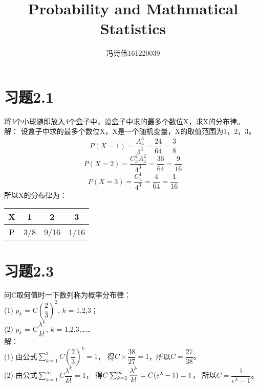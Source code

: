 \documentclass[a4papers]{ctexart}
\title{Probability and Mathmatical Statistics}
\author{冯诗伟161220039}
\date{}
\begin{document}
\maketitle
\section{习题2.1}
将3个小球随即放入4个盒子中，设盒子中求的最多个数位X，求X的分布律。\\
\noindent 解：
\indent 设盒子中求的最多个数位X，X是一个随机变量，X的取值范围为1，2，3。\\
\[ P(X=1) = \frac{A_4^3}{4^3}=\frac{24}{64}=\frac{3}{8} \]
\[ P(X=2) =\frac{C_3^2 A_4^2}{4^3} = \frac{36}{64}=\frac{9}{16} \]
\[P(X=3) = \frac{C_4^1}{4^3} = \frac{4}{64}=\frac{1}{16} \]
所以X的分布律为：\\
\begin{center}
\begin{tabular}{c|ccc}
X & 1 & 2 & 3 \\
\hline
P & 3/8 & 9/16 & 1/16
\end{tabular}
\end{center}

\section{习题2.3}
问C取何值时一下数列称为概率分布律：\\
(1) $p_k$ = C$\left( \dfrac{2}{3} \right)^2$, $k$ = 1,2,3；\\
(2) $p_k$ = C$\dfrac{\lambda^k}{k!}$, $k$ = 1,2,3,…… \\
\noindent 解：\\
(1) 由公式$\sum_{k=1}^3 C\left(\dfrac{2}{3}\right)^k = 1$，
得$C\times\dfrac{38}{27} = 1$，所以$C = \dfrac{27}{38}。$\\
(2) 由公式$\sum_{k=1}^\infty C\dfrac{\lambda^k}{k!} = 1$，
得$C\sum_{k=1}^\infty \dfrac{\lambda^k}{k!} = C\*(e^\lambda-1)= 1$，
所以$C = \dfrac{1}{e^\lambda-1}$。\\
\end{document}
